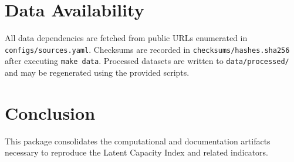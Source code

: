 \documentclass[11pt]{article}
\begin{document}
\section{Data Availability}
All data dependencies are fetched from public URLs enumerated in \texttt{configs/sources.yaml}. Checksums are recorded in \texttt{checksums/hashes.sha256} after executing \texttt{make data}. Processed datasets are written to \texttt{data/processed/} and may be regenerated using the provided scripts.

\section{Conclusion}
This package consolidates the computational and documentation artifacts necessary to reproduce the Latent Capacity Index and related indicators.

\begin{table}[t]
  \centering
  \caption{Pinned source artifacts}
  \label{tab:sources}
  
\end{table}

\begin{table}[t]
  \centering
  \caption{Core data primitives}
  \label{tab:primitives}
  
\end{table}
\end{document}
